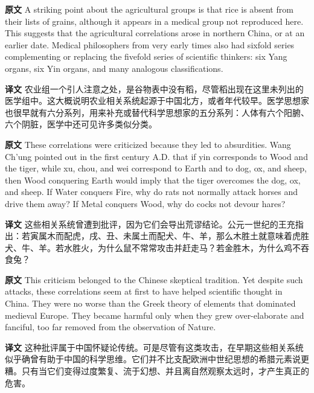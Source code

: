 \documentclass[UTF8,zihao=-4]{ctexart}
\newcommand{\BodyFont}{\fontsize{10.5pt}{15.5pt}\selectfont}
\newcommand{\origlabel}{\textbf{原文}\quad}
\newcommand{\translabel}{\textbf{译文}\quad}
\newenvironment{enblock}{\par\noindent\begingroup\BodyFont\origlabel}{\par\endgroup}
\newenvironment{zhblock}{\par\noindent\begingroup\BodyFont\translabel}{\par\endgroup\vspace{0.35em}}
\begin{document}
\begin{enblock}
A striking point about the agricultural groups is that rice is absent from their lists of grains, although it appears in a medical group not reproduced here. This suggests that the agricultural correlations arose in northern China, or at an earlier date. Medical philosophers from very early times also had sixfold series complementing or replacing the fivefold series of scientific thinkers: six Yang organs, six Yin organs, and many analogous classifications.
\end{enblock}
\begin{zhblock}
农业组一个引人注意之处，是谷物表中没有稻，尽管稻出现在这里未列出的医学组中。这大概说明农业相关系统起源于中国北方，或者年代较早。医学思想家也很早就有六分系列，用来补充或替代科学思想家的五分系列：人体有六个阳腑、六个阴脏，医学中还可见许多类似分类。
\end{zhblock}

\begin{enblock}
These correlations were criticized because they led to absurdities. Wang Ch'ung pointed out in the first century A.D. that if yin corresponds to Wood and the tiger, while xu, chou, and wei correspond to Earth and to dog, ox, and sheep, then Wood conquering Earth would imply that the tiger overcomes the dog, ox, and sheep. If Water conquers Fire, why do rats not normally attack horses and drive them away? If Metal conquers Wood, why do cocks not devour hares?
\end{enblock}
\begin{zhblock}
这些相关系统曾遭到批评，因为它们会导出荒谬结论。公元一世纪的王充指出：若寅属木而配虎，戌、丑、未属土而配犬、牛、羊，那么木胜土就意味着虎胜犬、牛、羊。若水胜火，为什么鼠不常常攻击并赶走马？若金胜木，为什么鸡不吞食兔？
\end{zhblock}

\begin{enblock}
This criticism belonged to the Chinese skeptical tradition. Yet despite such attacks, these correlations seem at first to have helped scientific thought in China. They were no worse than the Greek theory of elements that dominated medieval Europe. They became harmful only when they grew over-elaborate and fanciful, too far removed from the observation of Nature.
\end{enblock}
\begin{zhblock}
这种批评属于中国怀疑论传统。可是尽管有这类攻击，在早期这些相关系统似乎确曾有助于中国的科学思维。它们并不比支配欧洲中世纪思想的希腊元素说更糟。只有当它们变得过度繁复、流于幻想、并且离自然观察太远时，才产生真正的危害。
\end{zhblock}
\end{document}
